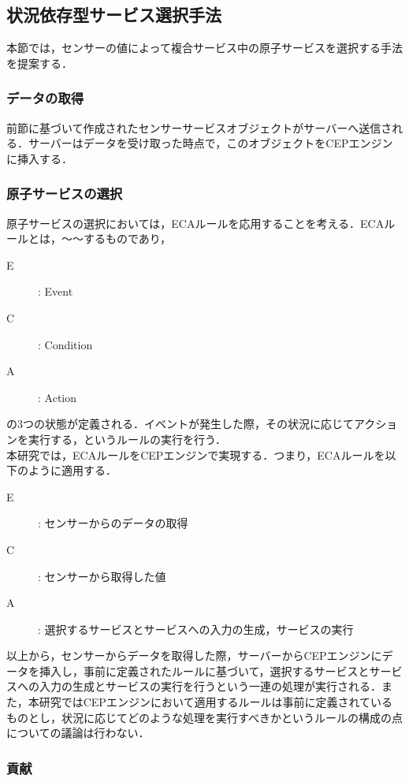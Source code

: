\documentclass{kuisthesis}			%
\begin{document}
\subsection{状況依存型サービス選択手法}
本節では，センサーの値によって複合サービス中の原子サービスを選択する手法を提案する．

\subsubsection{データの取得}
前節に基づいて作成されたセンサーサービスオブジェクトがサーバーへ送信される．サーバーはデータを受け取った時点で，このオブジェクトをCEPエンジンに挿入する．

\subsubsection{原子サービスの選択}
原子サービスの選択においては，ECAルールを応用することを考える．ECAルールとは，〜〜するものであり，
\begin{description}
\item[E] : Event
\item[C] : Condition
\item[A] : Action
\end{description}
の3つの状態が定義される．イベントが発生した際，その状況に応じてアクションを実行する，というルールの実行を行う．\\
本研究では，ECAルールをCEPエンジンで実現する．つまり，ECAルールを以下のように適用する．
\begin{description}
\item[E] : センサーからのデータの取得
\item[C] : センサーから取得した値
\item[A] : 選択するサービスとサービスへの入力の生成，サービスの実行
\end{description}
以上から，センサーからデータを取得した際，サーバーからCEPエンジンにデータを挿入し，事前に定義されたルールに基づいて，選択するサービスとサービスへの入力の生成とサービスの実行を行うという一連の処理が実行される．また，本研究ではCEPエンジンにおいて適用するルールは事前に定義されているものとし，状況に応じてどのような処理を実行すべきかというルールの構成の点についての議論は行わない．

\subsubsection{貢献}
\end{document}
